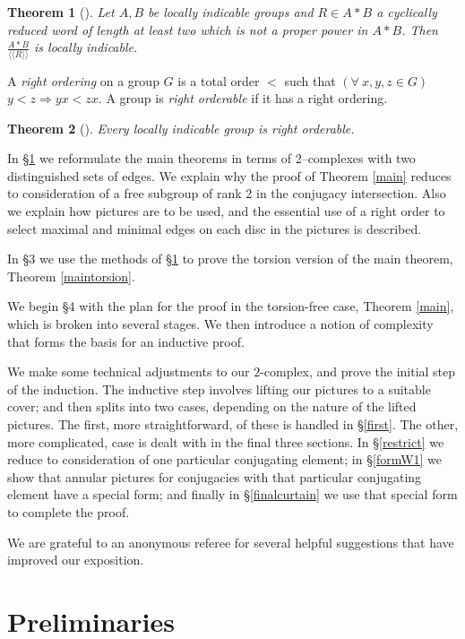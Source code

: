 \documentclass[12pt,a4paper]{amsart}
\def\<{\langle}
\def\>{\rangle}
\newtheorem{thm}{Theorem}[section]
\begin{document}
\begin{thm}[\cite{H82}]\label{Gli}
	Let $A,B$ be locally indicable groups and $R\in A*B$ 
	a cyclically reduced word of length at least two which is not a proper power in $A*B$. 
	Then $\frac{A*B}{\<\< R\>\>}$ is locally indicable. 
\end{thm}
A {\em right ordering} on a group $G$ is a total order $<$ such that $(\forall ~x,y,z\in G)$ $y<z\Rightarrow yx<zx$.  
A group is {\em right orderable} if it has a right ordering.

\begin{thm}[\cite{BH}]\label{lilo}
	Every locally indicable group is right orderable.
\end{thm}
 

In \S \ref{prelims} 
we reformulate the main theorems in terms of 2--complexes with
two distinguished sets of edges.  
We explain 
why the proof of Theorem \ref{main} reduces to consideration of a free subgroup 
of rank $2$ in the conjugacy intersection.
Also 
we explain how pictures are to be used, 
and the essential use of a right order to select maximal and minimal edges
on each disc in the pictures is described.

In \S3 we use the methods of \S \ref{prelims} to prove the torsion version of the main theorem, Theorem \ref{maintorsion}.
 
We begin \S4 with the plan for the proof in the torsion-free case, Theorem \ref{main}, which is broken into
several stages.  We then  introduce a notion of complexity that forms the basis for an inductive proof.

We make some technical adjustments to our $2$-complex, and prove the initial step of the induction. 
The inductive step involves lifting our pictures to a suitable cover; and then splits into two cases,
depending on the nature of the lifted pictures.  The first, more straightforward, of these
 is handled in \S \ref{first}.  The other, more complicated, case is dealt with in the final three sections.  In \S \ref{restrict} we reduce to consideration of one particular conjugating element; in \S \ref{formW1} we show that annular pictures for conjugacies with that particular conjugating element have a special form; and finally in \S \ref{finalcurtain} we use that special form to complete the proof. 

 \medskip 
We are grateful to an anonymous referee for several helpful suggestions that have improved our exposition.


\section{Preliminaries}\label{prelims} 
\end{document}
